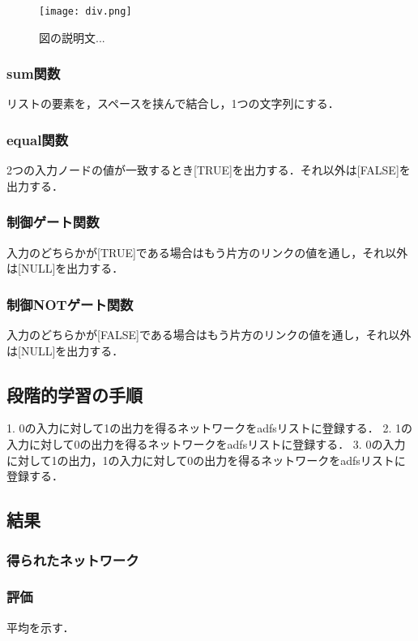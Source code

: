 \documentclass[exploratorypaper]{jsaiart} %
\begin{document}
\begin{figure}[t]
    \begin{center}
        \texttt{[image: div.png]}
    \end{center}
    \capwidth=50mm %
    \caption{図の説明文... }
\end{figure}



\subsubsection{sum関数}
リストの要素を，スペースを挟んで結合し，1つの文字列にする．

\subsubsection{equal関数}
2つの入力ノードの値が一致するとき[TRUE]を出力する．それ以外は[FALSE]を出力する．
\subsubsection{制御ゲート関数}
入力のどちらかが[TRUE]である場合はもう片方のリンクの値を通し，それ以外は[NULL]を出力する．
\subsubsection{制御NOTゲート関数}
入力のどちらかが[FALSE]である場合はもう片方のリンクの値を通し，それ以外は[NULL]を出力する．

\subsection{段階的学習の手順}
1. 0の入力に対して1の出力を得るネットワークをadfsリストに登録する．
2. 1の入力に対して0の出力を得るネットワークをadfsリストに登録する．
3. 0の入力に対して1の出力，1の入力に対して0の出力を得るネットワークをadfsリストに登録する．

\subsection{結果}
\subsubsection{得られたネットワーク}
\subsubsection{評価}
平均を示す．
\end{document}

